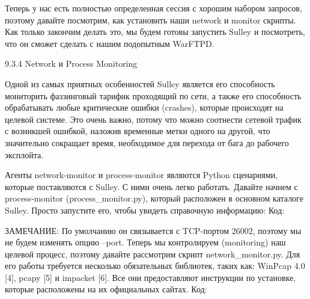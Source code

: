 \documentclass[12pt]{book}
\begin{document}
Теперь у нас есть полностью определенная сессия с хорошим набором запросов, поэтому давайте посмотрим, как установить наши network и monitor скрипты. Как только закончим делать это, мы будем готовы запустить Sulley и посмотреть, что он сможет сделать с нашим подопытным WarFTPD.

9.3.4 Network и Process Monitoring

Одной из самых приятных особенностей Sulley является его способность мониторить фаззинговый тарифик проходящий по сети, а также его способность обрабатывать любые критические ошибки (crashes), которые происходят на целевой системе. Это очень важно, потому что можно соотнести сетевой трафик с возникшей ошибкой, наложив временные метки одного на другой, что значительно сокращает время, необходимое для перехода от бага до рабочего эксплойта.

Агенты network-monitor и process-monitor являются Python сценариями, которые поставляются с Sulley. С ними очень легко работать. Давайте начнем с process-monitor (process\_monitor.py), который расположен в основном каталоге Sulley. Просто запустите его, чтобы увидеть справочную информацию:
Код:


ЗАМЕЧАНИЕ: По умолчанию он связывается с TCP-портом 26002, поэтому мы не будем изменять опцию --port.
Теперь мы контролируем (monitoring) наш целевой процесс, поэтому давайте рассмотрим скрипт network\_monitor.py. Для его работы требуется несколько обязательных библиотек, таких как: WinPcap 4.0 [4], pcapy [5] и impacket [6]. Все они предоставляют инструкции по установке, которые расположены на их официальных сайтах. 
Код:


\end{document}
